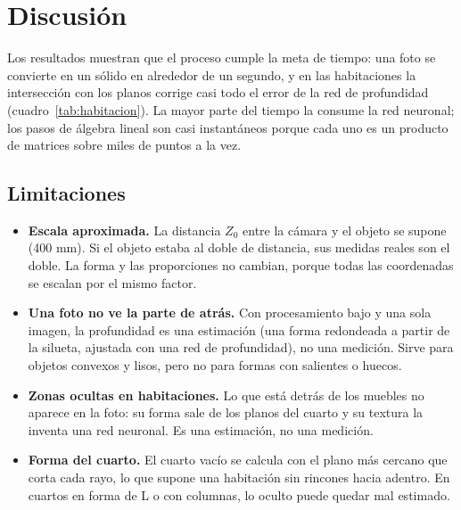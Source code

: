 \section{Discusión}

Los resultados muestran que el proceso cumple la meta de tiempo: una foto se
convierte en un sólido en alrededor de un segundo, y en las habitaciones la
intersección con los planos corrige casi todo el error de la red de
profundidad (cuadro~\ref{tab:habitacion}). La mayor parte del
tiempo la consume la red neuronal; los pasos de álgebra lineal son casi
instantáneos porque cada uno es un producto de matrices sobre miles de
puntos a la vez.

\subsection{Limitaciones}

\begin{itemize}
  \item \textbf{Escala aproximada.} La distancia $Z_0$ entre la cámara y el
        objeto se supone (400 mm). Si el objeto estaba al doble de distancia,
        sus medidas reales son el doble. La forma y las proporciones no
        cambian, porque todas las coordenadas se escalan por el mismo factor.
  \item \textbf{Una foto no ve la parte de atrás.} Con procesamiento bajo y una sola imagen, la
        profundidad es una estimación (una forma redondeada a partir de la
        silueta, ajustada con una red de profundidad), no una medición. Sirve para objetos convexos y lisos, pero
        no para formas con salientes o huecos.
  \item \textbf{Zonas ocultas en habitaciones.} Lo que está detrás de los
        muebles no aparece en la foto: su forma sale de los planos del cuarto
        y su textura la inventa una red neuronal. Es una estimación, no una
        medición.
  \item \textbf{Forma del cuarto.} El cuarto vacío se calcula con el plano más
        cercano que corta cada rayo, lo que supone una habitación sin rincones
        hacia adentro. En cuartos en forma de L o con columnas, lo oculto
        puede quedar mal estimado.
\end{itemize}

